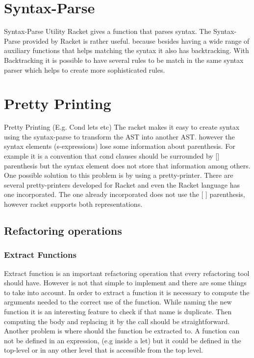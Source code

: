 \section{Syntax-Parse}
Syntax-Parse Utility
Racket gives a function that parses syntax. The Syntax-Parse provided by Racket
is rather useful. because besides having a wide range of auxiliary functions that
helps matching the syntax it also has backtracking. With Backtracking it is
possible to have several rules to be match in the same syntax parser which
helps to create more sophisticated rules.


\section{ Pretty Printing}

Pretty Printing (E.g. Cond lets etc)
The racket makes it easy to create syntax using the syntax-parse to transform the
AST into another AST. however the syntax elements (s-expressions) lose some information
about parenthesis. For example it is a convention that cond clauses should be
surrounded by [] parenthesis but the syntax element does not store that information
 among others. One possible solution to this problem is by using a pretty-printer.
 There are several pretty-printers developed for Racket and even the Racket language
 has one incorporated.
 The one already incorporated does not use the [ ] parenthesis, however racket
 supports both representations.

\subsection{Refactoring operations}

\subsubsection{Extract Functions}
Extract function is an important refactoring operation that every refactoring tool
should have. However is not that simple to implement and there are some things to
take into account.
In order to extract a function it is necessary to compute the arguments needed
to the correct use of the function. While naming the new function it is an interesting
feature to check if that name is duplicate.
Then computing the body and replacing it by the call should be straightforward.
Another problem is where should the function be extracted to. A function can not
be defined in an expression, (e.g inside a let) but it could be defined in the top-level
or in any other level that is accessible from the top level.

